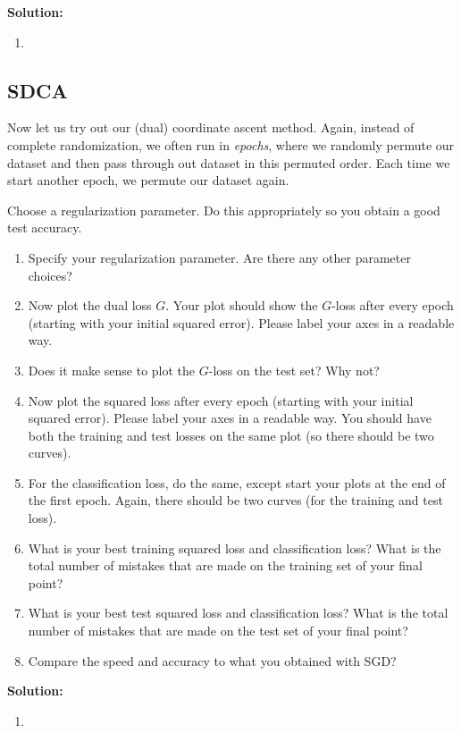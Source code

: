 \documentclass{article}
\newcommand{\solution}{\textbf{\vskip 0.2cm \large Solution:\\}}
\begin{document}
\solution

\begin{enumerate}
	\item
\end{enumerate}


\subsection{SDCA}
Now let us try out our (dual) coordinate ascent method.  Again, instead of complete randomization, we often run in \emph{epochs}, where we randomly permute our dataset and then pass through out dataset in this permuted order. Each time we start another epoch, we permute our dataset again.

Choose a regularization parameter. Do this appropriately so you obtain a good test accuracy.

\begin{enumerate}
	\item Specify your regularization parameter. Are there any other parameter choices?
	\item  Now plot the dual loss $G$. Your plot should show the $G$-loss after every epoch (starting with your initial squared error). Please label your axes in a readable way.
	\item Does it make sense to plot the $G$-loss on the test set? Why not?
	\item  Now plot the squared loss after every epoch (starting with your initial squared error). Please label your axes in a readable way.  You should have both the training and test losses on the same plot (so there should be two curves).
	\item  For the classification loss, do the same, except start your plots at the end of the first epoch. Again, there should be two curves (for the training and test loss).
	\item   What is your best training squared loss and classification loss? What is the total number of mistakes that are made on the training set of your final point?
	\item   What is your best test squared loss and classification loss? What is the total number of mistakes that are made on the test set of your final point?
	\item Compare the speed and accuracy to what you obtained with SGD?
\end{enumerate}

\solution

\begin{enumerate}
	\item 
\end{enumerate}
\end{document}
